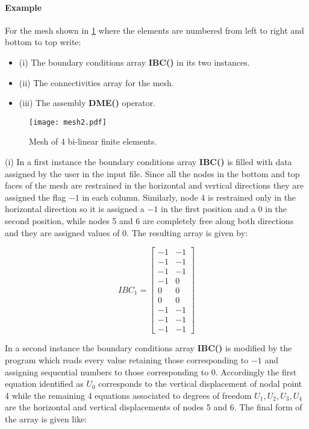 \paragraph*{Example}
For the mesh shown in \cref{fig:quad} where the elements are numbered from left to right and bottom to top write:

\begin{itemize}
\item (i) The boundary conditions array {\bf IBC()} in its two instances.
\item (ii) The connectivities array for the mesh.
\item (iii) The assembly {\bf DME()} operator.
\end{itemize}

\begin{figure}[h]
\centering
\texttt{[image: mesh2.pdf]}
\caption{Mesh of 4 bi-linear finite elements.}
\label{fig:quad}
\end{figure}

(i) In a first instance the boundary conditions array {\bf IBC()} is filled with data assigned by the user in the input file. Since all the nodes in the bottom and top faces of the mesh are restrained in the horizontal and vertical directions they are assigned the flag $-1$ in each column. Similarly, node 4 is restrained only in the horizontal direction so it is assigned a $-1$ in the first position and a $0$ in the second position, while nodes 5 and 6 are completely free along both directions and they are assigned values of $0$. The resulting array is given by:

\[IBC_1 = \begin{bmatrix}
-1 & -1\\
-1 & -1\\
-1 & -1\\
-1 & 0\\
0 & 0\\
0 & 0\\
-1 & -1\\
-1 & -1\\
-1 & -1
\end{bmatrix}\]

In a second instance the boundary conditions array {\bf IBC()} is modified by the program which reads every value retaining those corresponding to $-1$ and assigning sequential numbers to those corresponding to $0$. Accordingly the first equation identified as $U_0$ corresponds to the vertical displacement of nodal point 4 while the remaining 4 equations associated to degrees of freedom $U_1 , U_2 , U_3 , U_4$ are the horizontal and vertical displacements of nodes 5 and 6. The final form of the array is given like: 

